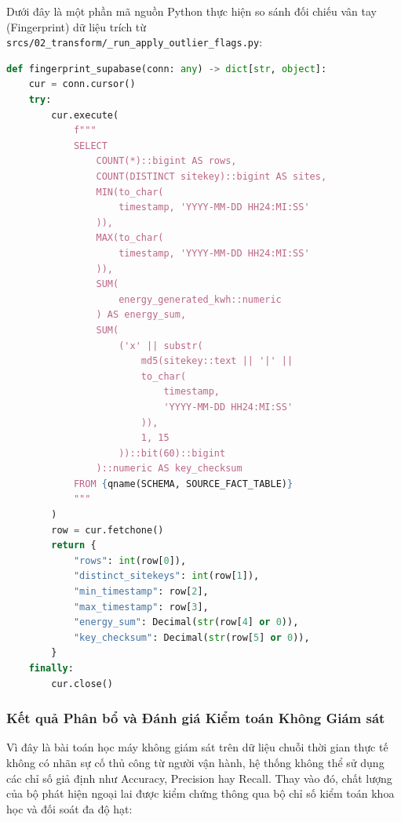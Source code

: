 \documentclass[12pt, a4paper]{report}
\begin{document}
Dưới đây là một phần mã nguồn Python thực hiện so sánh đối chiếu vân tay (Fingerprint) dữ liệu trích từ \texttt{srcs/02\_transform/\_run\_apply\_outlier\_flags.py}:

\begin{lstlisting}[language=Python, caption={Mã nguồn Python kiểm tra vân tay dữ liệu (Fingerprint) trước khi cập nhật}, label={lst:data_fingerprint}]
def fingerprint_supabase(conn: any) -> dict[str, object]:
    cur = conn.cursor()
    try:
        cur.execute(
            f"""
            SELECT
                COUNT(*)::bigint AS rows,
                COUNT(DISTINCT sitekey)::bigint AS sites,
                MIN(to_char(
                    timestamp, 'YYYY-MM-DD HH24:MI:SS'
                )),
                MAX(to_char(
                    timestamp, 'YYYY-MM-DD HH24:MI:SS'
                )),
                SUM(
                    energy_generated_kwh::numeric
                ) AS energy_sum,
                SUM(
                    ('x' || substr(
                        md5(sitekey::text || '|' || 
                        to_char(
                            timestamp, 
                            'YYYY-MM-DD HH24:MI:SS'
                        )),
                        1, 15
                    ))::bit(60)::bigint
                )::numeric AS key_checksum
            FROM {qname(SCHEMA, SOURCE_FACT_TABLE)}
            """
        )
        row = cur.fetchone()
        return {
            "rows": int(row[0]),
            "distinct_sitekeys": int(row[1]),
            "min_timestamp": row[2],
            "max_timestamp": row[3],
            "energy_sum": Decimal(str(row[4] or 0)),
            "key_checksum": Decimal(str(row[5] or 0)),
        }
    finally:
        cur.close()
\end{lstlisting}

\subsubsection{Kết quả Phân bổ và Đánh giá Kiểm toán Không Giám sát}
Vì đây là bài toán học máy không giám sát trên dữ liệu chuỗi thời gian thực tế không có nhãn sự cố thủ công từ người vận hành, hệ thống không thể sử dụng các chỉ số giả định như Accuracy, Precision hay Recall. Thay vào đó, chất lượng của bộ phát hiện ngoại lai được kiểm chứng thông qua bộ chỉ số kiểm toán khoa học và đối soát đa độ hạt:
\end{document}
